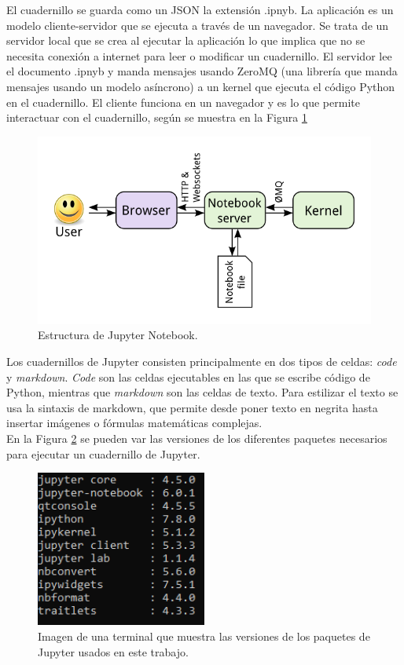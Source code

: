 \documentclass[a4paper,12pt]{report}
\begin{document}
El cuadernillo se guarda como un JSON la extensión .ipnyb. La aplicación es un modelo cliente-servidor que se ejecuta a través de un navegador. Se trata de un servidor local que se crea al ejecutar la aplicación lo que implica que no se necesita conexión a internet para leer o modificar un cuadernillo.  El servidor lee el documento .ipnyb y manda mensajes usando ZeroMQ (una librería que manda mensajes usando un modelo asíncrono) a un kernel que ejecuta el código Python en el cuadernillo. El cliente funciona en un navegador y es lo que permite interactuar con el cuadernillo, según se muestra en la Figura \ref{estructurajupyter}
\begin{figure}[h]
\centering
\includegraphics[width=1.0\textwidth]{imagenes/estructurajupyter}
\caption{Estructura de Jupyter Notebook.}
\label{estructurajupyter}
\end{figure}

Los cuadernillos de Jupyter consisten principalmente en dos tipos de celdas: \emph{code} y \emph{markdown}.\emph{ Code }son las celdas ejecutables en las que se escribe código de Python, mientras que \emph{markdown} son las celdas de texto. Para estilizar el texto se usa  la sintaxis de markdown, que permite desde poner texto en negrita hasta insertar imágenes o fórmulas matemáticas complejas.\\

En la Figura \ref{versionjupyter} se pueden var las versiones de los diferentes paquetes necesarios para ejecutar un cuadernillo de Jupyter.

\begin{figure}[h]
\centering
\includegraphics[width=0.5\textwidth]{imagenes/versionjupyter}
\caption{Imagen de una terminal que muestra las versiones de los paquetes de Jupyter usados en este trabajo.}
\label{versionjupyter}
\end{figure}
\end{document}
